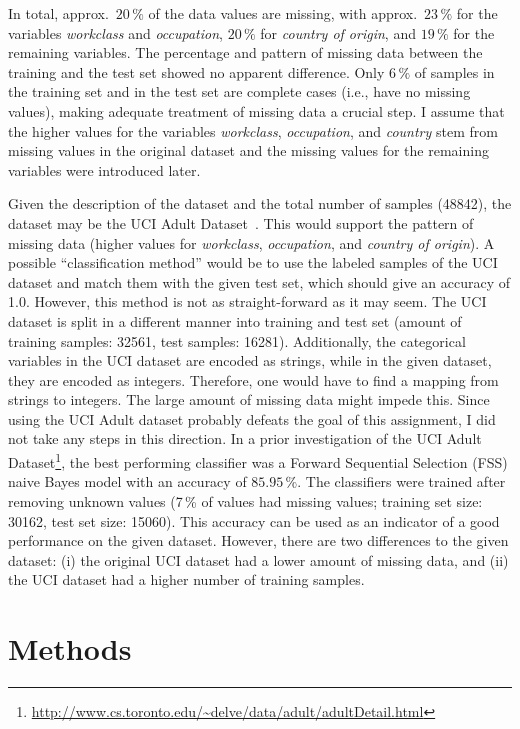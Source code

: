 \documentclass[a4paper,11pt]{article}
\begin{document}
In total, approx.\
$20\,\%$ of the data values are missing, with approx.\
$23\,\%$ for the variables \emph{workclass} and \emph{occupation},
$20\,\%$ for \emph{country of origin}, and
$19\,\%$ for the remaining variables. The percentage and pattern of
missing data between the training and the test set showed no apparent
difference. Only
$6\,\%$ of samples in the training set and in the test set are
complete cases (i.e., have no missing values), making adequate
treatment of missing data a crucial step. I assume that the higher
values for the variables \emph{workclass}, \emph{occupation}, and
\emph{country} stem from missing values in the original dataset and
the missing values for the remaining variables were introduced later.

Given the description of the dataset and the total number of samples
(48842), the dataset may be the UCI Adult
Dataset~\cite{lichman2013}. This would support the pattern of missing
data (higher values for \emph{workclass}, \emph{occupation}, and
\emph{country of origin}). A possible ``classification method'' would
be to use the labeled samples of the UCI dataset and match them with
the given test set, which should give an accuracy of 1.0. However,
this method is not as straight-forward as it may seem. The UCI dataset
is split in a different manner into training and test set (amount of
training samples: 32561, test samples: 16281). Additionally, the
categorical variables in the UCI dataset are encoded as strings, while
in the given dataset, they are encoded as integers. Therefore, one
would have to find a mapping from strings to integers. The large
amount of missing data might impede this. Since using the UCI Adult
dataset probably defeats the goal of this assignment, I did not take
any steps in this direction. In a prior investigation of the UCI Adult
Dataset\footnote{\url{http://www.cs.toronto.edu/~delve/data/adult/adultDetail.html}},
the best performing classifier was a Forward Sequential Selection
(FSS) naive Bayes model with an accuracy of $85.95\,\%$. The
classifiers were trained after removing unknown values (7\,\% of
values had missing values; training set size: 30162, test set size:
15060). This accuracy can be used as an indicator of a good
performance on the given dataset. However, there are two differences
to the given dataset: (i) the original UCI dataset had a lower amount
of missing data, and (ii) the UCI dataset had a higher number of
training samples.

\section{Methods}
\label{sec:methods}
\end{document}
